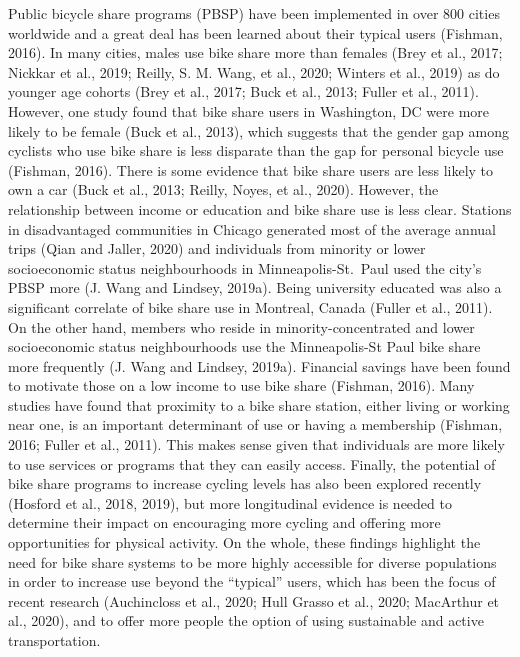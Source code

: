 \documentclass[]{elsarticle} %
\begin{document}
Public bicycle share programs (PBSP) have been implemented in over 800
cities worldwide and a great deal has been learned about their typical
users (Fishman, 2016). In many cities, males use bike share more than
females (Brey et al., 2017; Nickkar et al., 2019; Reilly, S. M. Wang, et
al., 2020; Winters et al., 2019) as do younger age cohorts (Brey et al.,
2017; Buck et al., 2013; Fuller et al., 2011). However, one study found
that bike share users in Washington, DC were more likely to be female
(Buck et al., 2013), which suggests that the gender gap among cyclists
who use bike share is less disparate than the gap for personal bicycle
use (Fishman, 2016). There is some evidence that bike share users are
less likely to own a car (Buck et al., 2013; Reilly, Noyes, et al.,
2020). However, the relationship between income or education and bike
share use is less clear. Stations in disadvantaged communities in
Chicago generated most of the average annual trips (Qian and Jaller,
2020) and individuals from minority or lower socioeconomic status
neighbourhoods in Minneapolis-St.~Paul used the city's PBSP more (J.
Wang and Lindsey, 2019a). Being university educated was also a
significant correlate of bike share use in Montreal, Canada (Fuller et
al., 2011). On the other hand, members who reside in
minority-concentrated and lower socioeconomic status neighbourhoods use
the Minneapolis-St Paul bike share more frequently (J. Wang and Lindsey,
2019a). Financial savings have been found to motivate those on a low
income to use bike share (Fishman, 2016). Many studies have found that
proximity to a bike share station, either living or working near one, is
an important determinant of use or having a membership (Fishman, 2016;
Fuller et al., 2011). This makes sense given that individuals are more
likely to use services or programs that they can easily access. Finally,
the potential of bike share programs to increase cycling levels has also
been explored recently (Hosford et al., 2018, 2019), but more
longitudinal evidence is needed to determine their impact on encouraging
more cycling and offering more opportunities for physical activity. On
the whole, these findings highlight the need for bike share systems to
be more highly accessible for diverse populations in order to increase
use beyond the ``typical'' users, which has been the focus of recent
research (Auchincloss et al., 2020; Hull Grasso et al., 2020; MacArthur
et al., 2020), and to offer more people the option of using sustainable
and active transportation.
\end{document}
